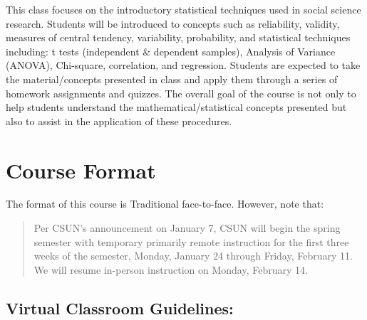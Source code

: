 \documentclass[11pt,]{article}
\begin{document}
This class focuses on the introductory statistical techniques used in
social science research. Students will be introduced to concepts such as
reliability, validity, measures of central tendency, variability,
probability, and statistical techniques including: t tests (independent
\& dependent samples), Analysis of Variance (ANOVA), Chi-square,
correlation, and regression. Students are expected to take the
material/concepts presented in class and apply them through a series of
homework assignments and quizzes. The overall goal of the course is not
only to help students understand the mathematical/statistical concepts
presented but also to assist in the application of these procedures.

\hypertarget{course-format}{%
\section{Course Format}\label{course-format}}

The format of this course is Traditional face-to-face. However, note
that:

\begin{quote}
Per CSUN's announcement on January 7, CSUN will begin the spring
semester with temporary primarily remote instruction for the first three
weeks of the semester, Monday, January 24 through Friday, February 11.
We will resume in-person instruction on Monday, February 14.
\end{quote}

\hypertarget{virtual-classroom-guidelines}{%
\subsection{Virtual Classroom
Guidelines:}\label{virtual-classroom-guidelines}}
\end{document}
